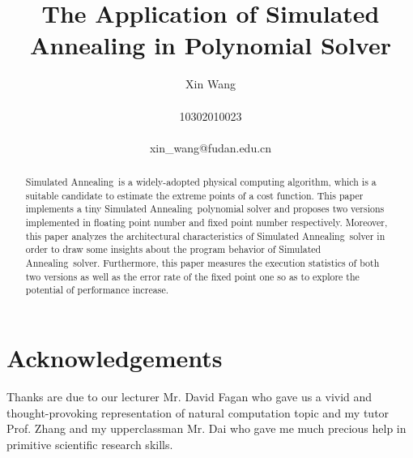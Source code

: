 \documentclass[twocolumn]{article}
\newcommand{\SA}{Simulated Annealing~}
\begin{document}
\title{{\bf The Application of Simulated Annealing in Polynomial Solver}\\ }

\author{Xin Wang\\ \vspace{0.5cm}\\
 10302010023\\ \vspace{0.01cm}\\
 xin\_wang@fudan.edu.cn\\}

\date{}
\maketitle
\begin{abstract}
\SA is a widely-adopted physical computing algorithm, which is a suitable candidate to estimate the extreme points of a cost function. This paper implements a tiny \SA polynomial solver and proposes two versions implemented in floating point number and fixed point number respectively. Moreover, this paper analyzes the architectural characteristics of \SA solver in order to draw some insights about the program behavior of \SA solver. Furthermore, this paper measures the execution statistics of both two versions as well as the error rate of the fixed point one so as to explore the potential of performance increase.
\end{abstract}














\section{Acknowledgements}
Thanks are due to our lecturer Mr. David Fagan who gave us a vivid and thought-provoking representation of natural computation topic and my tutor Prof. Zhang and my upperclassman Mr. Dai who gave me much precious help in primitive scientific research skills.



\end{document}
